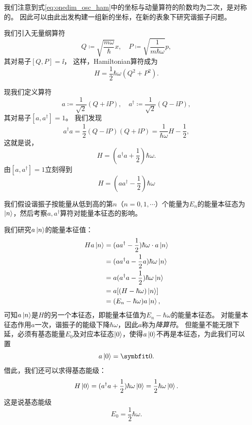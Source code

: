 我们注意到式\eqref{eq:onedim_osc_ham}中的坐标与动量算符的阶数均为二次，是对称的。
因此可以由此出发构建一组新的坐标，在新的表象下研究谐振子问题。

我们引入无量纲算符
\begin{equation}
    Q \coloneq \sqrt{\frac{m\omega}{\hbar}} x ,\quad P \coloneq \sqrt{\frac{1}{m\hbar\omega}} p,
\end{equation}
其对易子$[Q,P]=\ii$，
这样，Hamiltonian算符成为
\begin{equation}
    H = \frac12 \hbar\omega (Q^2+P^2).
\end{equation}

现我们定义算符
\begin{equation}
    a \coloneq \frac{1}{\sqrt{2}} (Q+\ii P) ,\quad a^\dag \coloneq \frac{1}{\sqrt{2}} (Q-\ii P),
\end{equation}
其对易子$[a,a^\dag]=1$。
我们发现
\begin{equation}
    a^\dag a = \frac12 (Q-\ii P)(Q+\ii P) = \frac{1}{\hbar\omega} H - \frac12,
\end{equation}
这就是说，
\begin{equation}
    H = (a^\dag a+\frac12)\hbar\omega.
\end{equation}
由$[a,a^\dag]=1$立刻得到
\begin{equation}
    H = (a a^\dag-\frac12)\hbar\omega
\end{equation}

我们假设谐振子按能量从低到高的第$n$（$n=0,1,\cdots$）个能量为$E_n$的能量本征态为$\ket{n}$，然后考察$a,a^\dag$算符对能量本征态的影响。

我们研究$a\ket{n}$的能量本征值：
\begin{equation}
\begin{aligned}
    H a \ket{n}
    &= (a a^\dagger - \frac12)\hbar\omega \cdot a \ket{n} \\
    &= (a a^\dagger a - \frac12 a)\hbar\omega \ket{n} \\
    &= a (a^\dagger a - \frac12)\hbar\omega \ket{n} \\
    &= a [(H-\hbar\omega) \ket{n}] \\
    &= (E_n-\hbar\omega) a \ket{n},
\end{aligned}
\end{equation}
可知$a\ket{n}$是$H$的另一个本征态，即能量本征值为$E_n-\hbar\omega$的能量本征态。
对能量本征态作用$a$一次，谐振子的能级下降$\hbar\omega$，因此$a$称为\emph{降算符}。
但能量不能无限下延，必须有基态能量$E_0$及对应本征态$\ket{0}$，使得$a\ket{0}$不再是本征态，为此我们可以置
\begin{equation}
    a \ket{0} = \bm{0}.
\end{equation}
借此，我们还可以求得基态能级：
\begin{equation}
    H\ket{0}
    = (a^\dagger a+\frac12)\hbar\omega \ket{0}
    = \frac12\hbar\omega \ket{0}.
\end{equation}
这是说基态能级
\begin{equation}
    E_0 = \frac12 \hbar\omega.
\end{equation}

